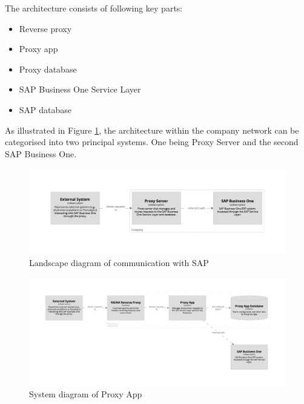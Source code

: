 The architecture consists of following key parts:
\begin{itemize}
    \item Reverse proxy
    \item Proxy app
    \item Proxy database
    \item SAP Business One Service Layer
    \item SAP database
\end{itemize}

As illustrated in Figure \ref{img07:structurizr:landscape}, the architecture within the company network can be categorised into two principal systems. One being Proxy Server and the second SAP Business One.

\begin{figure}[p]\centering
\includegraphics[width=140mm]{img/chap07/fig_structurizr-landscape.png}
\caption{Landscape diagram of communication with SAP}
\label{img07:structurizr:landscape}
\end{figure}

\begin{figure}[p]\centering
\includegraphics[width=140mm]{img/chap07/fig_structurizr-proxy-system.png}
\caption{System diagram of Proxy App}
\label{img07:structurizr:system:proxy}
\end{figure}

